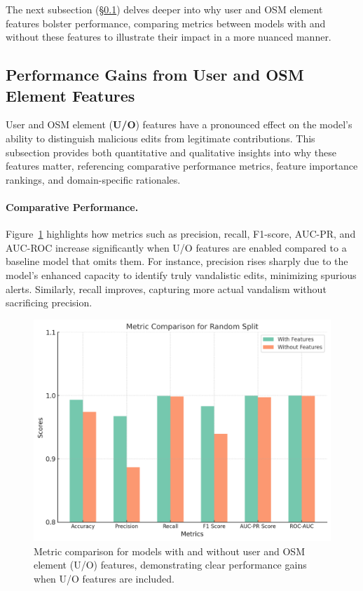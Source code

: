 \documentclass[
    13pt, %
    a4paper, %
    listof=totoc, %
    bibliography=totoc, %
    index=totoc, %
    headsepline
]{scrreprt}
\begin{document}
The next subsection (\S\ref{sec:importance_user_features}) delves deeper into why user and OSM element features bolster performance, comparing metrics between models with and without these features to illustrate their impact in a more nuanced manner.

\subsection{Performance Gains from User and OSM Element Features}
\label{sec:importance_user_features}

User and OSM element (\textbf{U/O}) features have a pronounced effect on the model’s ability to distinguish malicious edits from legitimate contributions. This subsection provides both quantitative and qualitative insights into why these features matter, referencing comparative performance metrics, feature importance rankings, and domain-specific rationales.

\paragraph{Comparative Performance.}
Figure~\ref{fig:bar_graph_comparison} highlights how metrics such as precision, recall, F1-score, AUC-PR, and AUC-ROC increase significantly when U/O features are enabled compared to a baseline model that omits them. For instance, precision rises sharply due to the model’s enhanced capacity to identify truly vandalistic edits, minimizing spurious alerts. Similarly, recall improves, capturing more actual vandalism without sacrificing precision.

\begin{figure}[H]
    \centering
    \includegraphics[width=\textwidth]{bar_graph_comparision_pcuof_vs_nuof.png}
    \caption{Metric comparison for models with and without user and OSM element (U/O) features, demonstrating clear performance gains when U/O features are included.}
    \label{fig:bar_graph_comparison}
\end{figure}
\end{document}

